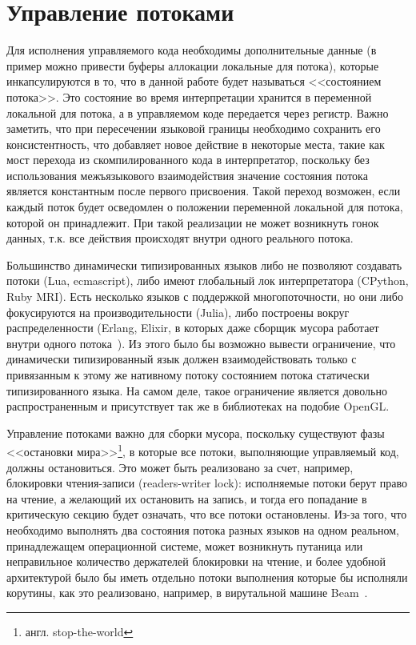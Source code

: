 \documentclass[times
]{itmo-student-thesis}
\begin{document}
\section{Управление потоками} \label{sec:thread-management}
Для исполнения управляемого кода необходимы дополнительные данные (в пример можно привести буферы аллокации локальные для потока), которые инкапсулируются в то, что в данной работе будет называться <<состоянием потока>>. Это состояние во время интерпретации хранится в переменной локальной для потока, а в управляемом коде передается через регистр. Важно заметить, что при пересечении языковой границы необходимо сохранить его консистентность, что добавляет новое действие в некоторые места, такие как мост перехода из скомпилированного кода в интерпретатор, поскольку без использования межъязыкового взаимодействия значение состояния потока является константным после первого присвоения. Такой переход возможен, если каждый поток будет осведомлен о положении переменной локальной для потока, которой он принадлежит. При такой реализации не может возникнуть гонок данных, т.к. все действия происходят внутри одного реального потока.

Большинство динамически типизированных языков либо не позволяют создавать потоки (Lua, ecmascript), либо имеют глобальный лок интерпретатора (CPython, Ruby MRI). Есть несколько языков с поддержкой многопоточности, но они либо фокусируются на производительности (Julia), либо построены вокруг распределенности (Erlang, Elixir, в которых даже сборщик мусора работает внутри одного потока~\cite{erlang-gc}). Из этого было бы возможно вывести ограничение, что динамически типизированный язык должен взаимодействовать только с привязанным к этому же нативному потоку состоянием потока статически типизированного языка. На самом деле, такое ограничение является довольно распространенным и присутствует так же в библиотеках на подобие OpenGL.

Управление потоками важно для сборки мусора, поскольку существуют фазы <<остановки мира>>\footnote{англ. stop-the-world}, в которые все потоки, выполняющие управляемый код, должны остановиться. Это может быть реализовано за счет, например, блокировки чтения-записи (readers-writer lock): исполняемые потоки берут право на чтение, а желающий их остановить на запись, и тогда его попадание в критическую секцию будет означать, что все потоки остановлены. Из-за того, что необходимо выполнять два состояния потока разных языков на одном реальном, принадлежащем операционной системе, может возникнуть путаница или неправильное количество держателей блокировки на чтение, и более удобной архитектурой было бы иметь отдельно потоки выполнения которые бы исполняли корутины, как это реализовано, например, в вирутальной машине Beam~\cite{beam-proc}.
\end{document}
